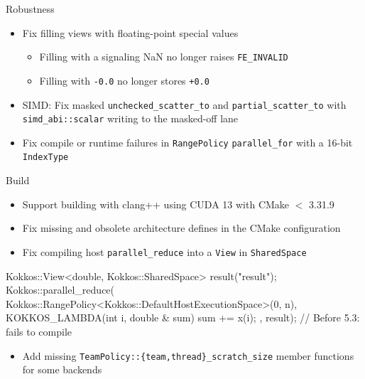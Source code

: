 
\begin{frame}[fragile]{Robustness}
  \begin{itemize}
    \item Fix filling views with floating-point special values
    \begin{itemize}
      \item Filling with a signaling NaN no longer raises \texttt{FE\_INVALID}
      \item Filling with \texttt{-0.0} no longer stores \texttt{+0.0}
    \end{itemize}
    \item SIMD: Fix masked \texttt{unchecked\_scatter\_to} and \texttt{partial\_scatter\_to} with \texttt{simd\_abi::scalar} writing to the masked-off lane
    \item Fix compile or runtime failures in \texttt{RangePolicy} \texttt{parallel\_for} with a 16-bit \texttt{IndexType}
  \end{itemize}
\end{frame}


\begin{frame}[fragile]{Build}
  \begin{itemize}
    \item Support building with clang++ using CUDA 13 with CMake $<$ 3.31.9
    \item Fix missing and obsolete architecture defines in the CMake configuration
    \item Fix compiling host \texttt{parallel\_reduce} into a \texttt{View} in \texttt{SharedSpace}
    \end{itemize}
    \begin{code}[keywords={Kokkos}]
Kokkos::View<double, Kokkos::SharedSpace> result("result");
Kokkos::parallel_reduce(
    Kokkos::RangePolicy<Kokkos::DefaultHostExecutionSpace>(0, n),
    KOKKOS_LAMBDA(int i, double & sum) { sum += x(i); },
    result); // Before 5.3: fails to compile
    \end{code}
    \begin{itemize}
    \item Add missing \texttt{TeamPolicy::\{team,thread\}\_scratch\_size} member functions for some backends
  \end{itemize}
\end{frame}

